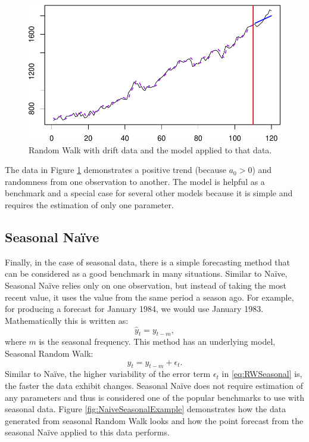 \documentclass[
]{book}
\theoremstyle{definition}
\theoremstyle{definition}
\theoremstyle{definition}
\theoremstyle{definition}
\theoremstyle{remark}
\begin{document}
\begin{figure}
\centering
\includegraphics{Svetunkov--2022----ADAM_files/figure-latex/RWDriftExample-1.pdf}
\caption{\label{fig:RWDriftExample}Random Walk with drift data and the model applied to that data.}
\end{figure}

The data in Figure \ref{fig:RWDriftExample} demonstrates a positive trend (because \(a_0>0\)) and randomness from one observation to another. The model is helpful as a benchmark and a special case for several other models because it is simple and requires the estimation of only one parameter.

\hypertarget{NaiveSeasonal}{%
\subsection{Seasonal Naïve}\label{NaiveSeasonal}}

Finally, in the case of seasonal data, there is a simple forecasting method that can be considered as a good benchmark in many situations. Similar to Naïve, Seasonal Naïve relies only on one observation, but instead of taking the most recent value, it uses the value from the same period a season ago. For example, for producing a forecast for January 1984, we would use January 1983. Mathematically this is written as:
\begin{equation}
    \hat{y}_t = y_{t-m} ,
    \label{eq:NaiveSeasonal}
\end{equation}
where \(m\) is the seasonal frequency. This method has an underlying model, Seasonal Random Walk:
\begin{equation}
    y_t = y_{t-m} + \epsilon_t.
    \label{eq:RWSeasonal}
\end{equation}
Similar to Naïve, the higher variability of the error term \(\epsilon_t\) in \eqref{eq:RWSeasonal} is, the faster the data exhibit changes. Seasonal Naïve does not require estimation of any parameters and thus is considered one of the popular benchmarks to use with seasonal data. Figure \ref{fig:NaiveSeasonalExample} demonstrates how the data generated from seasonal Random Walk looks and how the point forecast from the seasonal Naïve applied to this data performs.
\end{document}
